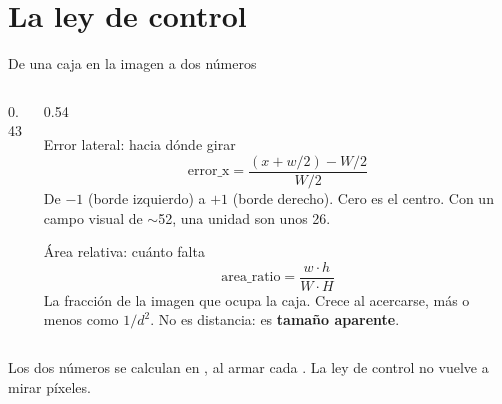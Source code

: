 \section{La ley de control}

\begin{frame}{De una caja en la imagen a dos números}
  \begin{columns}[c,onlytextwidth]
    \begin{column}{0.43\textwidth}
      \centering
    \end{column}
    \begin{column}{0.54\textwidth}
      \begin{block}{Error lateral: hacia dónde girar}
        \[ \text{error\_x} = \frac{(x + w/2) - W/2}{W/2} \]
        {\small De $-1$ (borde izquierdo) a $+1$ (borde derecho). Cero es el
        centro. Con un campo visual de $\sim$52\grad, una unidad son unos
        26\grad.}
      \end{block}
      \begin{block}{Área relativa: cuánto falta}
        \[ \text{area\_ratio} = \frac{w \cdot h}{W \cdot H} \]
        {\small La fracción de la imagen que ocupa la caja. Crece al acercarse,
        más o menos como $1/d^2$. No es distancia: es \textbf{tamaño
        aparente}.}
      \end{block}
    \end{column}
  \end{columns}

  \vspace{0.3em}
  {\footnotesize Los dos números se calculan en , al armar cada
  . La ley de control no vuelve a mirar píxeles.}
\end{frame}


